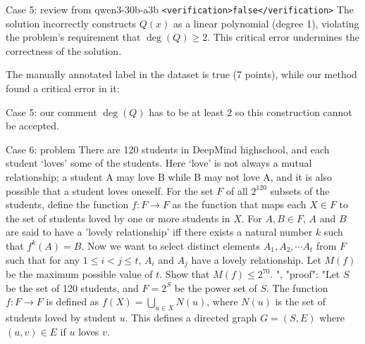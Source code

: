 \documentclass{article} %
\begin{document}
\begin{promptbox}{Case 5: review from qwen3-30b-a3b}
\verb|<verification>false</verification>|
The solution incorrectly constructs $ Q(x) $ as a linear polynomial (degree 1), violating the problem's requirement that $ \deg(Q) \geq 2 $. This critical error undermines the correctness of the solution.
\end{promptbox}

The manually annotated label in the dataset is true (7 points), while our method found a critical error in it:

\begin{promptbox}{Case 5: our comment}
   $ \deg(Q) $ has to be at least  $ 2 $ so this construction cannot be accepted. 
\end{promptbox}

\begin{promptbox}{Case 6: problem}
  There are 120 students in DeepMind highschool, and each student `loves' some of the students. Here `love' is not always a mutual relationship; a student A may love B while B may not love A, and it is also possible that a student loves oneself. For the set $F$ of all $2^{120}$ subsets of the students, define the function $f: F \rightarrow F$ as the function that maps each $X \in F$ to the set of students loved by one or more students in $X$. For $A, B \in F$, $A$ and $B$ are said to have a 'lovely relationship' iff there exists a natural number $k$ such that $f^{k}(A)=B$. Now we want to select distinct elements $A_{1}, A_{2}, \cdots A_{t}$ from $F$ such that for any $1 \leq i<j \leq t$, $A_{i}$ and $A_{j}$ have a lovely relationship. Let $M(f)$ be the maximum possible value of $t$.  Show that $M(f) \leq 2^{70}$. ",
  "proof": "Let $S$ be the set of 120 students, and $F = 2^S$ be the power set of $S$. The function $f: F \rightarrow F$ is defined as $f(X) = \bigcup_{u \in X} N(u)$, where $N(u)$ is the set of students loved by student $u$. This defines a directed graph $G=(S,E)$ where $(u,v) \in E$ if $u$ loves $v$.
\end{promptbox}
\end{document}
